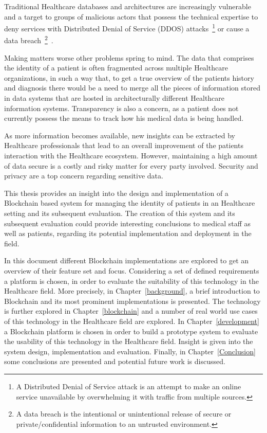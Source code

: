 Traditional Healthcare databases and architectures are increasingly vulnerable
and a target to groups of malicious actors that possess the technical expertise
to deny services with Distributed Denial of Service (DDOS) attacks~\footnote{A
Distributed Denial of Service attack is an attempt to make an online service
unavailable by overwhelming it with traffic from multiple sources.} or cause a
data breach~\footnote{A data breach is the intentional or unintentional release
of secure or private/confidential information to an untrusted
environment.}~\cite{mcCoy2018}. 

Making matters worse other problems spring to mind. The data that comprises the
identity of a patient is often fragmented across multiple Healthcare
organizations, in such a way that, to get a true overview of the patients
history and diagnosis there would be a need to merge all the pieces of
information stored in data systems that are hosted in architecturally different
Healthcare information systems. Transparency is also a concern, as a patient
does not currently possess the means to track how his medical data is being
handled.

As more information becomes available, new insights can be extracted by
Healthcare professionals that lead to an overall improvement of the patients
interaction with the Healthcare ecosystem. However, maintaining a high amount
of data secure is a costly and risky matter for every party involved. Security
and privacy are a top concern regarding sensitive data. 

This thesis provides an insight into the design and implementation of a
Blockchain based system for managing the identity of patients in an Healthcare
setting and its subsequent evaluation. The creation of this system and its
subsequent evaluation could provide interesting conclusions to medical staff as
well as patients, regarding its potential implementation and deployment in the
field.

In this document different Blockchain implementations are explored to get an
overview of their feature set and focus. Considering a set of defined
requirements a platform is chosen, in order to evaluate the suitability of this
technology in the Healthcare field. More precisely, in
Chapter~\ref{background}, a brief introduction to Blockchain and its most
prominent implementations is presented. The technology is further explored in
Chapter~\ref{blockchain} and a number of real world use cases of this
technology in the Healthcare field are explored.  In Chapter~\ref{development}
a Blockchain platform is chosen in order to build a prototype system to
evaluate the usability of this technology in the Healthcare field. Insight is
given into the system design, implementation and evaluation. Finally, in
Chapter~\ref{Conclusion} some conclusions are presented and potential future
work is discussed.
